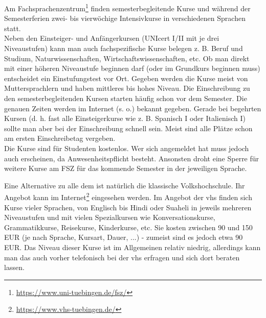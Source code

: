 Am Fachsprachenzentrum\footnote{\url{https://www.uni-tuebingen.de/fsz/}} finden semesterbegleitende Kurse und während der Semesterferien zwei- bis vierwöchige Intensivkurse in verschiedenen Sprachen statt.\\
Neben den Einsteiger- und Anfängerkursen (UNIcert I/II mit je drei Niveaustufen) kann man auch fachspezifische Kurse belegen z. B. Beruf und Studium, Naturwissenschaften, Wirtschaftswissenschaften, etc.  Ob man direkt mit einer höheren Niveaustufe beginnen darf (oder im Grundkurs beginnen muss) entscheidet ein Einstufungstest vor Ort.  Gegeben werden die Kurse meist von Muttersprachlern und haben mittleres bis hohes Niveau.
Die Einschreibung zu den semesterbegleitenden Kursen starten häufig schon vor dem Semester. Die genauen Zeiten werden im Internet (s. o.) bekannt gegeben.  Gerade bei begehrten Kursen (d. h. fast alle Einsteigerkurse wie z. B. Spanisch I oder Italienisch I) sollte man aber bei der  Einschreibung schnell sein. Meist sind alle Plätze schon am ersten Einschreibetag vergeben.\\
Die Kurse sind für Studenten kostenlos. Wer sich angemeldet hat muss jedoch auch erscheinen, da Anwesenheitspflicht besteht. Ansonsten droht eine Sperre für weitere Kurse am FSZ für das kommende Semester in der jeweiligen Sprache.
  
Eine Alternative zu alle dem ist natürlich die klassische Volkshochschule.  Ihr Angebot kann im Internet\footnote{\url{https://www.vhs-tuebingen.de/}} eingesehen werden.  Im Angebot der vhs finden sich Kurse vieler Sprachen, von Englisch bis Hindi oder Suaheli in jeweils mehreren Niveaustufen und mit vielen Spezialkursen wie Konversationskurse, Grammatikkurse, Reisekurse, Kinderkurse, etc.  Sie kosten zwischen 90 und 150 EUR (je nach Sprache, Kursart, Dauer, ...) - zumeist sind es jedoch etwa 90 EUR. Das Niveau dieser Kurse ist im Allgemeinen relativ niedrig, allerdings kann man das auch vorher telefonisch bei der vhs erfragen und sich dort beraten lassen.

\vfill

